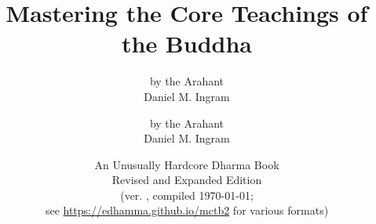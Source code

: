

\ifplastex\else
	\usepackage{newunicodechar}
	\usepackage[weather]{ifsym}
\fi

\def\vismAssertFootnoteCounter#1{\relax}

	\title{Mastering the Core Teachings of the Buddha}
	\date{An Unusually Hardcore Dharma Book \\ Revised and Expanded Edition \\ (ver. \vismCommitHref, compiled \today; \\ see \url{https://edhamma.github.io/mctb2} for various formats)}
	\ifplastex
		\author{by the Arahant \\ Daniel M. Ingram}
	\else
		\author{by the Arahant \\ Daniel M. Ingram}
	\fi
	\maketitle

	\frontmatter
		\renewcommand{\thechapter}{\arabic{chapter}}

		\bgroup
			\ifplastex\else\renewcommand{\baselinestretch}{0.2}\normalsize\fi
			\tableofcontents
		\egroup
		

